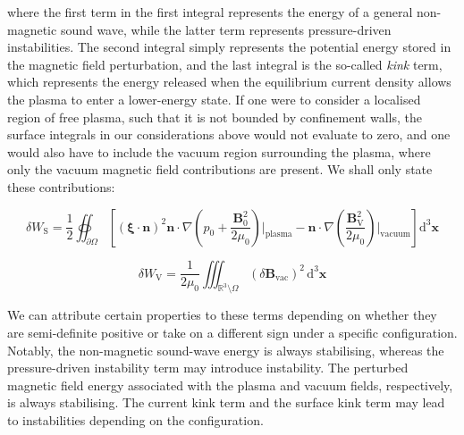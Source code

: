 where the first term in the first integral represents the energy of a general non-magnetic sound wave, while the latter term represents pressure-driven instabilities. The second integral simply represents the potential energy stored in the magnetic field perturbation, and the last integral is the so-called \textit{kink} term, which represents the energy released when the equilibrium current density allows the plasma to enter a lower-energy state. If one were to consider a localised region of free plasma, such that it is not bounded by confinement walls, the surface integrals in our considerations above would not evaluate to zero, and one would also have to include the vacuum region surrounding the plasma, where only the vacuum magnetic field contributions are present. We shall only state these contributions:

\begin{equation}
    \delta W_\text{S}=\frac{1}{2}\oiint_{\partial\Omega}\left[(\boldsymbol{\xi}\cdot\mathbf{n})^2\mathbf{n}\cdot\nabla\left(p_0+\frac{\mathbf{B}_0^2}{2\mu_0}\right)\Biggr|_\text{plasma}-\mathbf{n}\cdot\nabla\left(\frac{\mathbf{B}_\text{V}^2}{2\mu_0}\right)\Biggr|_\text{vacuum}\right]\mathrm{d}^3\mathbf{x}
\end{equation}

\begin{equation}
    \delta W_\text{V}=\frac{1}{2\mu_0}\iiint_{\mathbb{R}^3\setminus\Omega}(\delta\mathbf{B}_\text{vac})^2\,\mathrm{d}^3\mathbf{x}
\end{equation}

We can attribute certain properties to these terms depending on whether they are semi-definite positive or take on a different sign under a specific configuration. Notably, the non-magnetic sound-wave energy is always stabilising, whereas the pressure-driven instability term may introduce instability. The perturbed magnetic field energy associated with the plasma and vacuum fields, respectively, is always stabilising. The current kink term and the surface kink term may lead to instabilities depending on the configuration. 